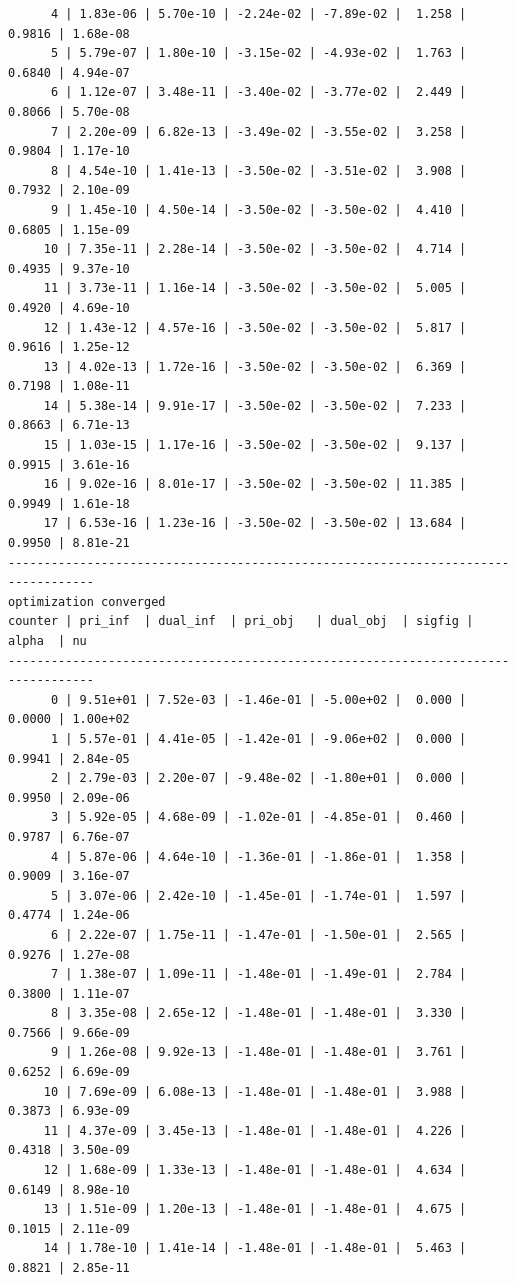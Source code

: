 \documentclass[
]{book}
\begin{document}
\begin{verbatim}
      4 | 1.83e-06 | 5.70e-10 | -2.24e-02 | -7.89e-02 |  1.258 | 0.9816 | 1.68e-08
      5 | 5.79e-07 | 1.80e-10 | -3.15e-02 | -4.93e-02 |  1.763 | 0.6840 | 4.94e-07
      6 | 1.12e-07 | 3.48e-11 | -3.40e-02 | -3.77e-02 |  2.449 | 0.8066 | 5.70e-08
      7 | 2.20e-09 | 6.82e-13 | -3.49e-02 | -3.55e-02 |  3.258 | 0.9804 | 1.17e-10
      8 | 4.54e-10 | 1.41e-13 | -3.50e-02 | -3.51e-02 |  3.908 | 0.7932 | 2.10e-09
      9 | 1.45e-10 | 4.50e-14 | -3.50e-02 | -3.50e-02 |  4.410 | 0.6805 | 1.15e-09
     10 | 7.35e-11 | 2.28e-14 | -3.50e-02 | -3.50e-02 |  4.714 | 0.4935 | 9.37e-10
     11 | 3.73e-11 | 1.16e-14 | -3.50e-02 | -3.50e-02 |  5.005 | 0.4920 | 4.69e-10
     12 | 1.43e-12 | 4.57e-16 | -3.50e-02 | -3.50e-02 |  5.817 | 0.9616 | 1.25e-12
     13 | 4.02e-13 | 1.72e-16 | -3.50e-02 | -3.50e-02 |  6.369 | 0.7198 | 1.08e-11
     14 | 5.38e-14 | 9.91e-17 | -3.50e-02 | -3.50e-02 |  7.233 | 0.8663 | 6.71e-13
     15 | 1.03e-15 | 1.17e-16 | -3.50e-02 | -3.50e-02 |  9.137 | 0.9915 | 3.61e-16
     16 | 9.02e-16 | 8.01e-17 | -3.50e-02 | -3.50e-02 | 11.385 | 0.9949 | 1.61e-18
     17 | 6.53e-16 | 1.23e-16 | -3.50e-02 | -3.50e-02 | 13.684 | 0.9950 | 8.81e-21
----------------------------------------------------------------------------------
optimization converged
counter | pri_inf  | dual_inf  | pri_obj   | dual_obj  | sigfig | alpha  | nu 
----------------------------------------------------------------------------------
      0 | 9.51e+01 | 7.52e-03 | -1.46e-01 | -5.00e+02 |  0.000 | 0.0000 | 1.00e+02
      1 | 5.57e-01 | 4.41e-05 | -1.42e-01 | -9.06e+02 |  0.000 | 0.9941 | 2.84e-05
      2 | 2.79e-03 | 2.20e-07 | -9.48e-02 | -1.80e+01 |  0.000 | 0.9950 | 2.09e-06
      3 | 5.92e-05 | 4.68e-09 | -1.02e-01 | -4.85e-01 |  0.460 | 0.9787 | 6.76e-07
      4 | 5.87e-06 | 4.64e-10 | -1.36e-01 | -1.86e-01 |  1.358 | 0.9009 | 3.16e-07
      5 | 3.07e-06 | 2.42e-10 | -1.45e-01 | -1.74e-01 |  1.597 | 0.4774 | 1.24e-06
      6 | 2.22e-07 | 1.75e-11 | -1.47e-01 | -1.50e-01 |  2.565 | 0.9276 | 1.27e-08
      7 | 1.38e-07 | 1.09e-11 | -1.48e-01 | -1.49e-01 |  2.784 | 0.3800 | 1.11e-07
      8 | 3.35e-08 | 2.65e-12 | -1.48e-01 | -1.48e-01 |  3.330 | 0.7566 | 9.66e-09
      9 | 1.26e-08 | 9.92e-13 | -1.48e-01 | -1.48e-01 |  3.761 | 0.6252 | 6.69e-09
     10 | 7.69e-09 | 6.08e-13 | -1.48e-01 | -1.48e-01 |  3.988 | 0.3873 | 6.93e-09
     11 | 4.37e-09 | 3.45e-13 | -1.48e-01 | -1.48e-01 |  4.226 | 0.4318 | 3.50e-09
     12 | 1.68e-09 | 1.33e-13 | -1.48e-01 | -1.48e-01 |  4.634 | 0.6149 | 8.98e-10
     13 | 1.51e-09 | 1.20e-13 | -1.48e-01 | -1.48e-01 |  4.675 | 0.1015 | 2.11e-09
     14 | 1.78e-10 | 1.41e-14 | -1.48e-01 | -1.48e-01 |  5.463 | 0.8821 | 2.85e-11

\end{verbatim}
\end{document}
